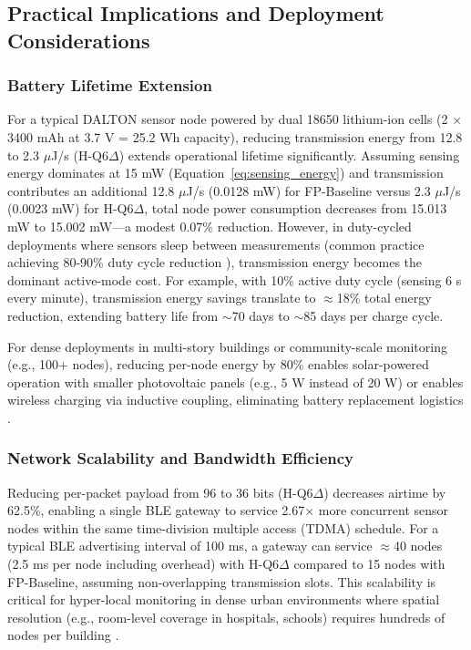 \subsection{Practical Implications and Deployment Considerations}

\subsubsection{Battery Lifetime Extension}

For a typical DALTON sensor node powered by dual 18650 lithium-ion cells (2 $\times$ 3400 mAh at 3.7 V = 25.2 Wh capacity), reducing transmission energy from 12.8 to 2.3 $\mu$J/s (H-Q6$\Delta$) extends operational lifetime significantly. Assuming sensing energy dominates at 15 mW (Equation~\eqref{eq:sensing_energy}) and transmission contributes an additional 12.8 $\mu$J/s (0.0128 mW) for FP-Baseline versus 2.3 $\mu$J/s (0.0023 mW) for H-Q6$\Delta$, total node power consumption decreases from 15.013 mW to 15.002 mW—a modest 0.07\% reduction. However, in duty-cycled deployments where sensors sleep between measurements (common practice achieving 80-90\% duty cycle reduction \cite{przystupa2025ensuring}), transmission energy becomes the dominant active-mode cost. For example, with 10\% active duty cycle (sensing 6 s every minute), transmission energy savings translate to $\approx$18\% total energy reduction, extending battery life from $\sim$70 days to $\sim$85 days per charge cycle.

For dense deployments in multi-story buildings or community-scale monitoring (e.g., 100+ nodes), reducing per-node energy by 80\% enables solar-powered operation with smaller photovoltaic panels (e.g., 5 W instead of 20 W) or enables wireless charging via inductive coupling, eliminating battery replacement logistics \cite{bakare2026iot}.

\subsubsection{Network Scalability and Bandwidth Efficiency}

Reducing per-packet payload from 96 to 36 bits (H-Q6$\Delta$) decreases airtime by 62.5\%, enabling a single BLE gateway to service 2.67$\times$ more concurrent sensor nodes within the same time-division multiple access (TDMA) schedule. For a typical BLE advertising interval of 100 ms, a gateway can service $\approx$40 nodes (2.5 ms per node including overhead) with H-Q6$\Delta$ compared to 15 nodes with FP-Baseline, assuming non-overlapping transmission slots. This scalability is critical for hyper-local monitoring in dense urban environments where spatial resolution (e.g., room-level coverage in hospitals, schools) requires hundreds of nodes per building \cite{wang2025indoor, camacho2025leveraging}.


